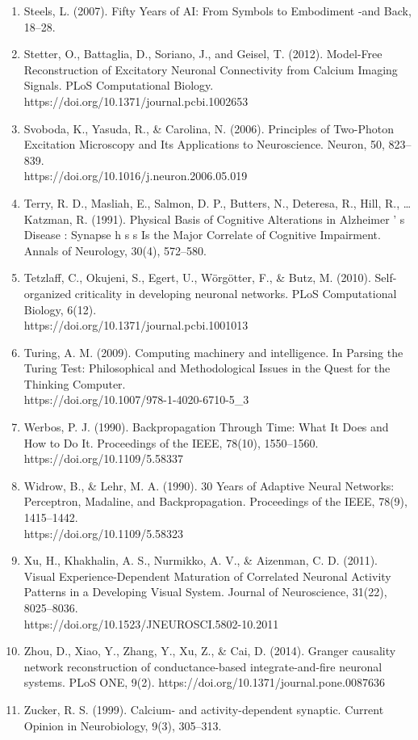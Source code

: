 \documentclass[11pt]{article}
\begin{document}
\begin{enumerate}
\item Steels, L. (2007). Fifty Years of AI: From Symbols to Embodiment -and Back, 18–28.
\item Stetter, O., Battaglia, D., Soriano, J., and Geisel, T. (2012). Model-Free Reconstruction of Excitatory Neuronal Connectivity from Calcium Imaging Signals. PLoS Computational Biology. https://doi.org/10.1371/journal.pcbi.1002653
\item Svoboda, K., Yasuda, R., \& Carolina, N. (2006). Principles of Two-Photon Excitation Microscopy and Its Applications to Neuroscience. Neuron, 50, 823–839.\\https://doi.org/10.1016/j.neuron.2006.05.019
\item Terry, R. D., Masliah, E., Salmon, D. P., Butters, N., Deteresa, R., Hill, R., … Katzman, R. (1991). Physical Basis of Cognitive Alterations in Alzheimer ’ s Disease : Synapse h s s Is the Major Correlate of Cognitive Impairment. Annals of Neurology, 30(4), 572–580.
\item Tetzlaff, C., Okujeni, S., Egert, U., Wörgötter, F., \& Butz, M. (2010). Self-organized criticality in developing neuronal networks. PLoS Computational Biology, 6(12).\\https://doi.org/10.1371/journal.pcbi.1001013
\item Turing, A. M. (2009). Computing machinery and intelligence. In Parsing the Turing Test: Philosophical and Methodological Issues in the Quest for the Thinking Computer.\\https://doi.org/10.1007/978-1-4020-6710-5\_3
\item Werbos, P. J. (1990). Backpropagation Through Time: What It Does and How to Do It. Proceedings of the IEEE, 78(10), 1550–1560. https://doi.org/10.1109/5.58337
\item Widrow, B., \& Lehr, M. A. (1990). 30 Years of Adaptive Neural Networks: Perceptron, Madaline, and Backpropagation. Proceedings of the IEEE, 78(9), 1415–1442.\\https://doi.org/10.1109/5.58323
\item Xu, H., Khakhalin, A. S., Nurmikko, A. V., \& Aizenman, C. D. (2011). Visual Experience-Dependent Maturation of Correlated Neuronal Activity Patterns in a Developing Visual System. Journal of Neuroscience, 31(22), 8025–8036.\\ https://doi.org/10.1523/JNEUROSCI.5802-10.2011
\item Zhou, D., Xiao, Y., Zhang, Y., Xu, Z., \& Cai, D. (2014). Granger causality network reconstruction of conductance-based integrate-and-fire neuronal systems. PLoS ONE, 9(2). https://doi.org/10.1371/journal.pone.0087636
\item Zucker, R. S. (1999). Calcium- and activity-dependent synaptic. Current Opinion in Neurobiology, 9(3), 305–313.
\end{enumerate}
\end{document}
